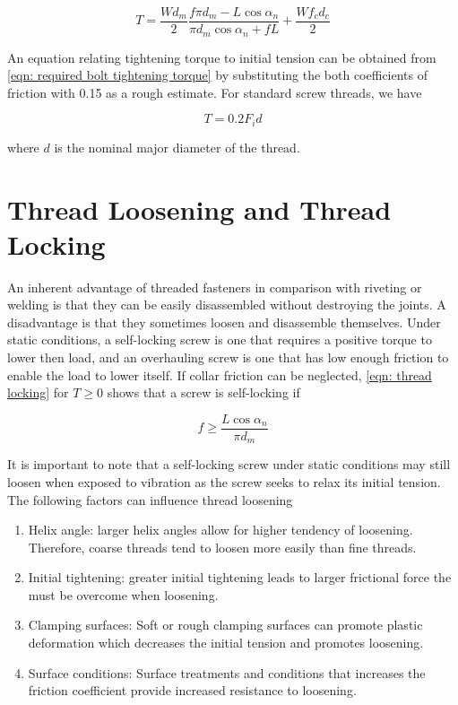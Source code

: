 \documentclass[
10pt,
a4paper,
openany,
svgnames,
]{book}
\begin{document}
\[T = \frac{Wd_m}{2}\frac{f\pi d_m - L\cos \alpha_n}{\pi d_m\cos \alpha_n + fL} + \frac{Wf_cd_c}{2}\]

An equation relating tightening torque to initial tension can be obtained from \cref{eqn: required bolt tightening torque} by substituting the both coefficients of friction with 0.15 as a rough estimate. For standard screw threads, we have

\begin{equation}
  T = 0.2F_id
\end{equation}

where $d$ is the nominal major diameter of the thread.

\section{Thread Loosening and Thread Locking}

An inherent advantage of threaded fasteners in comparison with riveting or welding is that they can be easily disassembled without destroying the joints. A disadvantage is that they sometimes loosen and disassemble themselves.
Under static conditions, a self-locking screw is one that requires a positive torque to lower then load, and an overhauling screw is one that has low enough friction to enable the load to lower itself. If collar friction can be neglected, \cref{eqn: thread locking} for $T \geqslant 0$ shows that a screw is self-locking if

\begin{equation} \label{eqn: thread locking}
  f \geqslant \frac{L\cos \alpha_n}{\pi d_m}
\end{equation}

It is important to note that a self-locking screw under static conditions may still loosen when exposed to vibration as the screw seeks to relax its initial tension. The following factors can influence thread loosening

\begin{enumerate}
\item Helix angle: larger helix angles allow for higher tendency of loosening. Therefore, coarse threads tend to loosen more easily than fine threads.
\item Initial tightening: greater initial tightening leads to larger frictional force the must be overcome when loosening.
\item Clamping surfaces: Soft or rough clamping surfaces can promote plastic deformation which decreases the initial tension and promotes loosening.
\item Surface conditions: Surface treatments and conditions that increases the friction coefficient provide increased resistance to loosening.
\end{enumerate}
  
\end{document}
